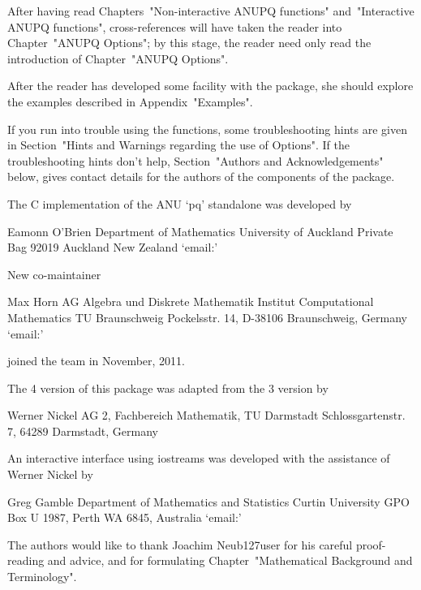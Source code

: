 After   having   read    Chapters~"Non-interactive    ANUPQ    functions"
and~"Interactive ANUPQ functions", cross-references will have  taken  the
reader into Chapter~"ANUPQ Options"; by this stage, the reader need  only
read the introduction of Chapter~"ANUPQ Options".

After the reader has developed some facility with the  {\ANUPQ}  package,
she should explore the examples described in Appendix~"Examples".

If  you  run  into   trouble   using   the   {\ANUPQ}   functions,   some
troubleshooting hints are given in Section~"Hints and Warnings  regarding
the  use  of  Options".  If  the  troubleshooting   hints   don't   help,
Section~"Authors and Acknowledgements" below, gives contact  details  for
the authors of the components of the {\ANUPQ} package.


The C implementation of the ANU `pq' standalone was developed by

\begintt
Eamonn O'Brien
Department of Mathematics
University of Auckland
Private Bag 92019
Auckland
New Zealand
\endtt
{}`email:' 

New co-maintainer

\begintt
Max Horn
AG Algebra und Diskrete Mathematik
Institut Computational Mathematics
TU Braunschweig
Pockelsstr. 14, D-38106 Braunschweig, Germany
\endtt
{}`email:' 

joined the team in November, 2011.

The {\GAP} 4 version of this package was adapted from the {\GAP} 3
version by  

\begintt
Werner Nickel
AG 2, Fachbereich Mathematik, TU Darmstadt
Schlossgartenstr. 7, 64289 Darmstadt, Germany
\endtt

An  interactive  interface  using  iostreams  was  developed   with   the
assistance of Werner Nickel by

\begintt
Greg Gamble
Department of Mathematics and Statistics
Curtin University
GPO Box U 1987, Perth WA 6845, Australia
\endtt
{}`email:' 

The authors would  like  to  thank  Joachim  Neub\accent127user  for  his
careful    proof-reading    and    advice,    and     for     formulating
Chapter~"Mathematical Background and Terminology".

